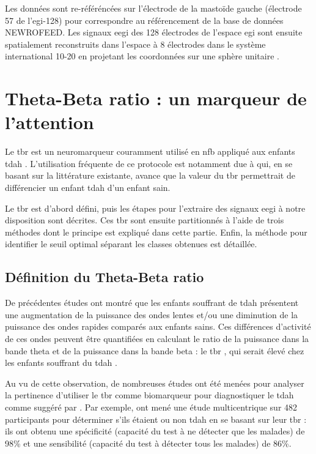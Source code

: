Les données sont re-référéncées sur l'électrode de la mastoïde gauche (électrode 57 de l'\gls{egi}-128) pour correspondre au référencement de la base
de données NEWROFEED. Les signaux \gls{eegi} des 128 électrodes de l'espace \gls{egi} sont ensuite spatialement reconstruits dans l'espace à 8 électrodes 
dans le système international 10-20 en projetant les coordonnées sur une sphère unitaire \citep{Perrin1989}.


\section{Theta-Beta ratio : un marqueur de l'attention}

Le \gls{tbr} est un neuromarqueur couramment utilisé en \gls{nfb} appliqué aux enfants \gls{tdah} \citep{Arns2013}. L'utilisation fréquente de ce protocole est notamment due
à \citet{Lubar1991} qui, en se basant sur la littérature existante, avance que la valeur du \gls{tbr} permettrait de différencier un enfant \gls{tdah} d'un enfant sain.  

Le \gls{tbr} est d'abord défini, puis les étapes pour l'extraire des
signaux \gls{eegi} à notre disposition sont décrites. Ces \gls{tbr} sont ensuite partitionnés à l'aide de trois méthodes dont le principe est expliqué dans cette partie. 
Enfin, la méthode pour identifier le seuil optimal séparant les classes obtenues est détaillée.

\subsection{Définition du Theta-Beta ratio}
De précédentes études ont montré que les enfants souffrant de \gls{tdah} présentent une augmentation
de la puissance des ondes lentes et/ou une diminution de la puissance des ondes rapides
comparés aux enfants sains. Ces différences d'activité de ces 
ondes peuvent être quantifiées en calculant le ratio de la puissance dans la bande theta et de la puissance dans la bande beta : le 
\gls{tbr} \citep{Arns2013}, qui serait élevé chez les enfants souffrant du \gls{tdah} \citep{Lubar1991, Monastra1999, Barry2009, Snyder2006}. 

Au vu de cette observation, de nombreuses études ont été menées pour analyser la pertinence d'utiliser le \gls{tbr} comme biomarqueur pour 
diagnostiquer le \gls{tdah} comme suggéré par \citet{Lubar1991}. 
Par exemple, \citet{Monastra1999} ont mené une étude multicentrique sur 482 participants pour déterminer s'ils étaient ou non \gls{tdah} en se basant sur leur \gls{tbr} : 
ils ont obtenu une spécificité (capacité du test à ne détecter que les malades) de 98\% et une sensibilité (capacité du test à détecter tous les malades) de 86\%. 

